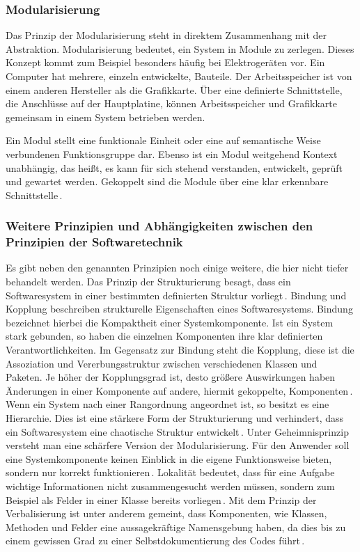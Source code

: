 \documentclass[12pt,oneside,a4paper,parskip]{scrbook}
\begin{document}
\subsubsection{Modularisierung}

Das Prinzip der Modularisierung steht in direktem Zusammenhang mit der Abstraktion. Modularisierung bedeutet, ein System in Module zu zerlegen. Dieses Konzept kommt zum Beispiel besonders häufig bei Elektrogeräten vor. Ein Computer hat mehrere, einzeln entwickelte, Bauteile. Der Arbeitsspeicher ist von einem anderen Hersteller als die Grafikkarte. Über eine definierte Schnittstelle, die Anschlüsse auf der Hauptplatine, können Arbeitsspeicher und Grafikkarte gemeinsam in einem System betrieben werden.

Ein Modul stellt eine funktionale Einheit oder eine auf semantische Weise verbundenen Funktionsgruppe dar. Ebenso ist ein Modul weitgehend Kontext unabhängig, das heißt, es kann für sich stehend verstanden, entwickelt, geprüft und gewartet werden. Gekoppelt sind die Module über eine klar erkennbare Schnittstelle\,\cite[S.\,41]{balzert2009a}.

\subsubsection{Weitere Prinzipien und Abhängigkeiten zwischen den Prinzipien der Softwaretechnik}

Es gibt neben den genannten Prinzipien noch einige weitere, die hier nicht tiefer behandelt werden. Das Prinzip der Strukturierung besagt, dass ein Softwaresystem in einer bestimmten definierten Struktur vorliegt\,\cite[S.\,34ff.]{balzert2009a}. Bindung und Kopplung beschreiben strukturelle Eigenschaften eines Softwaresystems. Bindung bezeichnet hierbei die Kompaktheit einer Systemkomponente. Ist ein System stark gebunden, so haben die einzelnen Komponenten ihre klar definierten Verantwortlichkeiten. Im Gegensatz zur Bindung steht die Kopplung, diese ist die Assoziation und Vererbungsstruktur zwischen verschiedenen Klassen und Paketen. Je höher der Kopplungsgrad ist, desto größere Auswirkungen haben Änderungen in einer Komponente auf andere, hiermit gekoppelte, Komponenten\,\cite[S.\,37f.]{balzert2009a}. Wenn ein System nach einer Rangordnung angeordnet ist, so besitzt es eine Hierarchie. Dies ist eine stärkere Form der Strukturierung und verhindert, dass ein Softwaresystem eine chaotische Struktur entwickelt\,\cite[S.\,39ff.]{balzert2009a}. Unter Geheimnisprinzip versteht man eine schärfere Version der Modularisierung. Für den Anwender soll eine Systemkomponente keinen Einblick in die eigene Funktionsweise bieten, sondern nur korrekt funktionieren\,\cite[S.\,42ff.]{balzert2009a}. Lokalität bedeutet, dass für eine Aufgabe wichtige Informationen nicht zusammengesucht werden müssen, sondern zum Beispiel als Felder in einer Klasse bereits vorliegen\,\cite[S.\,45f.]{balzert2009a}. Mit dem Prinzip der Verbalisierung ist unter anderem gemeint, dass Komponenten, wie Klassen, Methoden und Felder eine aussagekräftige Namensgebung haben, da dies bis zu einem gewissen Grad zu einer Selbstdokumentierung des Codes führt\,\cite[S.\,46ff.]{balzert2009a}.
\end{document}
